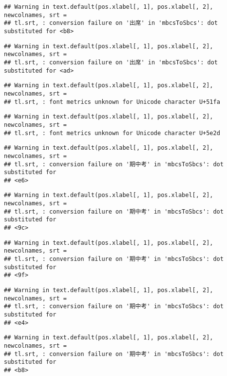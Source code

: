 \documentclass[
]{book}
\begin{document}
\begin{verbatim}
## Warning in text.default(pos.xlabel[, 1], pos.xlabel[, 2], newcolnames, srt =
## tl.srt, : conversion failure on '出席' in 'mbcsToSbcs': dot substituted for <b8>
\end{verbatim}

\begin{verbatim}
## Warning in text.default(pos.xlabel[, 1], pos.xlabel[, 2], newcolnames, srt =
## tl.srt, : conversion failure on '出席' in 'mbcsToSbcs': dot substituted for <ad>
\end{verbatim}

\begin{verbatim}
## Warning in text.default(pos.xlabel[, 1], pos.xlabel[, 2], newcolnames, srt =
## tl.srt, : font metrics unknown for Unicode character U+51fa
\end{verbatim}

\begin{verbatim}
## Warning in text.default(pos.xlabel[, 1], pos.xlabel[, 2], newcolnames, srt =
## tl.srt, : font metrics unknown for Unicode character U+5e2d
\end{verbatim}

\begin{verbatim}
## Warning in text.default(pos.xlabel[, 1], pos.xlabel[, 2], newcolnames, srt =
## tl.srt, : conversion failure on '期中考' in 'mbcsToSbcs': dot substituted for
## <e6>
\end{verbatim}

\begin{verbatim}
## Warning in text.default(pos.xlabel[, 1], pos.xlabel[, 2], newcolnames, srt =
## tl.srt, : conversion failure on '期中考' in 'mbcsToSbcs': dot substituted for
## <9c>
\end{verbatim}

\begin{verbatim}
## Warning in text.default(pos.xlabel[, 1], pos.xlabel[, 2], newcolnames, srt =
## tl.srt, : conversion failure on '期中考' in 'mbcsToSbcs': dot substituted for
## <9f>
\end{verbatim}

\begin{verbatim}
## Warning in text.default(pos.xlabel[, 1], pos.xlabel[, 2], newcolnames, srt =
## tl.srt, : conversion failure on '期中考' in 'mbcsToSbcs': dot substituted for
## <e4>
\end{verbatim}

\begin{verbatim}
## Warning in text.default(pos.xlabel[, 1], pos.xlabel[, 2], newcolnames, srt =
## tl.srt, : conversion failure on '期中考' in 'mbcsToSbcs': dot substituted for
## <b8>
\end{verbatim}
\end{document}
